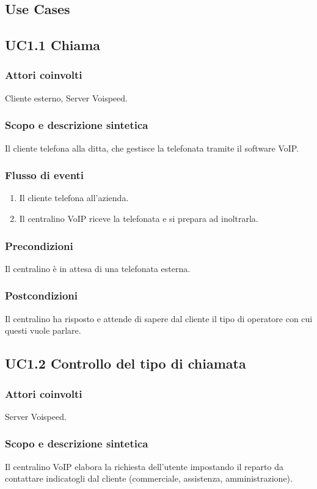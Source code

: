 \subsection{Use Cases}
\subsection*{UC1.1 Chiama}
\subsubsection*{Attori coinvolti} Cliente esterno, Server Voispeed.
\subsubsection*{Scopo e descrizione sintetica}
Il cliente telefona alla ditta, che gestisce la telefonata tramite il software VoIP.
\subsubsection*{Flusso di eventi}
\begin{enumerate}
\item Il cliente telefona all'azienda.
\item Il centralino VoIP riceve la telefonata e si prepara ad inoltrarla.
\end{enumerate}
\subsubsection*{Precondizioni}  Il centralino \` e in attesa di una telefonata esterna.
\subsubsection*{Postcondizioni} Il centralino ha risposto e attende di sapere dal cliente il tipo di operatore con cui questi vuole parlare.

\subsection*{UC1.2 Controllo del tipo di chiamata}
\subsubsection*{Attori coinvolti} Server Voispeed.
\subsubsection*{Scopo e descrizione sintetica}
Il centralino VoIP elabora la richiesta dell'utente impostando il reparto da contattare indicatogli dal cliente (commerciale, assistenza, amministrazione).
